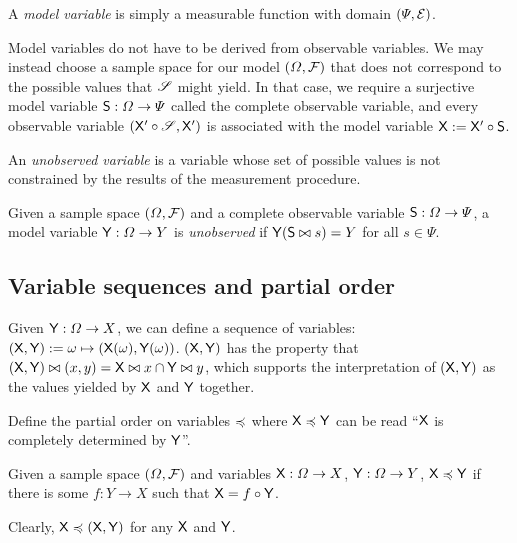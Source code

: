 A \emph{model variable} is simply a measurable function with domain $(\Psi,\mathcal{E})$.

Model variables do not have to be derived from observable variables. We may instead choose a sample space for our model $(\Omega,\mathcal{F})$ that does not correspond to the possible values that $\mathscr{S}$ might yield. In that case, we require a surjective model variable $\mathsf{S}:\Omega\to \Psi$ called the complete observable variable, and every observable variable $(\mathsf{X}'\circ \mathscr{S},\mathsf{X}')$ is associated with the model variable $\mathsf{X}:=\mathsf{X}'\circ \mathsf{S}$.

An \emph{unobserved variable} is a variable whose set of possible values is not constrained by the results of the measurement procedure.

\begin{definition}\label{def:unobserved_variable}
Given a sample space $(\Omega,\mathcal{F})$ and a complete observable variable $\mathsf{S}:\Omega\to\Psi$, a model variable $\mathsf{Y}:\Omega\to Y$ is \emph{unobserved} if $\mathsf{Y}(\mathsf{S}\bowtie s)=Y$ for all $s\in \Psi$.
\end{definition}

\subsection{Variable sequences and partial order}

Given $\mathsf{Y}:\Omega\to X$, we can define a sequence of variables: $(\mathsf{X},\mathsf{Y}):=\omega\mapsto (\mathsf{X}(\omega),\mathsf{Y}(\omega))$. $(\mathsf{X},\mathsf{Y})$ has the property that $(\mathsf{X},\mathsf{Y})\bowtie (x,y)= \mathsf{X}\bowtie x\cap \mathsf{Y}\bowtie y$, which supports the interpretation of $(\mathsf{X},\mathsf{Y})$ as the values yielded by $\mathsf{X}$ and $\mathsf{Y}$ together.

Define the partial order on variables $\preccurlyeq$ where $\mathsf{X}\preccurlyeq \mathsf{Y}$ can be read ``$\mathsf{X}$ is completely determined by $\mathsf{Y}$''.

\begin{definition}\label{def:variable_po}
Given a sample space $(\Omega,\mathcal{F})$ and variables $\mathsf{X}:\Omega\to X$, $\mathsf{Y}:\Omega\to Y$, $\mathsf{X}\preccurlyeq \mathsf{Y}$ if there is some $f:Y\to X$ such that $\mathsf{X}=f\circ \mathsf{Y}$.
\end{definition}

Clearly, $\mathsf{X}\preccurlyeq(\mathsf{X},\mathsf{Y})$ for any $\mathsf{X}$ and $\mathsf{Y}$.

